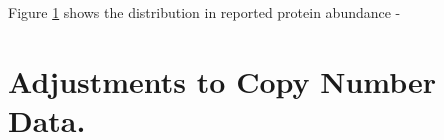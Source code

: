 \documentclass[11pt]{article}
\begin{document}
Figure \ref{} shows the distribution in reported protein abundance - 


\section{Adjustments to Copy Number Data.}

%
\end{document}
